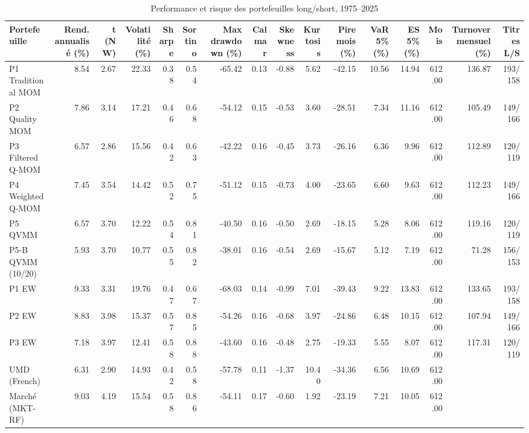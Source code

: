 \begin{table}[htbp]
\centering
\small
\caption{Performance et risque des portefeuilles long/short, 1975–2025}
\label{tab:T5_performance}
\begin{tabular}{lrrrrrrrrrrrrrrr}
\toprule
Portefeuille & Rend. annualisé (\%) & t (NW) & Volatilité (\%) & Sharpe & Sortino & Max drawdown (\%) & Calmar & Skewness & Kurtosis & Pire mois (\%) & VaR 5\% (\%) & ES 5\% (\%) & Mois & Turnover mensuel (\%) & Titres L/S \\
\midrule
P1 Traditional MOM & 8.54 & 2.67 & 22.33 & 0.38 & 0.54 & -65.42 & 0.13 & -0.88 & 5.62 & -42.15 & 10.56 & 14.94 & 612.00 & 136.87 & 193/158 \\
P2 Quality MOM & 7.86 & 3.14 & 17.21 & 0.46 & 0.68 & -54.12 & 0.15 & -0.53 & 3.60 & -28.51 & 7.34 & 11.16 & 612.00 & 105.49 & 149/166 \\
P3 Filtered Q-MOM & 6.57 & 2.86 & 15.56 & 0.42 & 0.63 & -42.22 & 0.16 & -0.45 & 3.73 & -26.16 & 6.36 & 9.96 & 612.00 & 112.89 & 120/119 \\
P4 Weighted Q-MOM & 7.45 & 3.54 & 14.42 & 0.52 & 0.75 & -51.12 & 0.15 & -0.73 & 4.00 & -23.65 & 6.60 & 9.63 & 612.00 & 112.23 & 149/166 \\
P5 QVMM & 6.57 & 3.70 & 12.22 & 0.54 & 0.81 & -40.50 & 0.16 & -0.50 & 2.69 & -18.15 & 5.28 & 8.06 & 612.00 & 119.16 & 120/119 \\
P5-B QVMM (10/20) & 5.93 & 3.70 & 10.77 & 0.55 & 0.82 & -38.01 & 0.16 & -0.54 & 2.69 & -15.67 & 5.12 & 7.19 & 612.00 & 71.28 & 156/153 \\
P1 EW & 9.33 & 3.31 & 19.76 & 0.47 & 0.67 & -68.03 & 0.14 & -0.99 & 7.01 & -39.43 & 9.22 & 13.83 & 612.00 & 133.65 & 193/158 \\
P2 EW & 8.83 & 3.98 & 15.37 & 0.57 & 0.85 & -54.26 & 0.16 & -0.68 & 3.97 & -24.86 & 6.48 & 10.15 & 612.00 & 107.94 & 149/166 \\
P3 EW & 7.18 & 3.97 & 12.41 & 0.58 & 0.88 & -43.60 & 0.16 & -0.48 & 2.75 & -19.33 & 5.55 & 8.07 & 612.00 & 117.31 & 120/119 \\
UMD (French) & 6.31 & 2.90 & 14.93 & 0.42 & 0.58 & -57.78 & 0.11 & -1.37 & 10.40 & -34.36 & 6.56 & 10.69 & 612.00 &  &  \\
Marché (MKT-RF) & 9.03 & 4.19 & 15.54 & 0.58 & 0.86 & -54.11 & 0.17 & -0.60 & 1.92 & -23.19 & 7.21 & 10.05 & 612.00 &  &  \\
\bottomrule
\end{tabular}
\end{table}